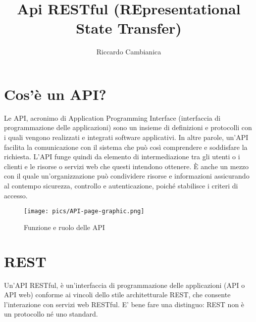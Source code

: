 \documentclass{article}
\title{Api RESTful (REpresentational State Transfer)}
\author{Riccardo Cambianica}
\begin{document}
    \maketitle
     \newpage
     \tableofcontents
     \newpage
     \section{Cos'è un API?}
         Le API, acronimo di Application Programming Interface (interfaccia di programmazione delle applicazioni) sono un insieme di definizioni e protocolli con i quali vengono realizzati e integrati software applicativi. In altre parole, un'API facilita la comunicazione con il sistema che può così comprendere e soddisfare la richiesta. L'API funge quindi da elemento di intermediazione tra gli utenti o i clienti e le risorse o servizi web che questi intendono ottenere. È anche un mezzo con il quale un'organizzazione può condividere risorse e informazioni assicurando al contempo sicurezza, controllo e autenticazione, poiché stabilisce i criteri di accesso.
         \begin{figure}[htbp]
             \centering
             \texttt{[image: pics/API-page-graphic.png]}  
             \caption{Funzione e ruolo delle API}
             \label{fig:api}
         \end{figure}
     \section{REST}
        Un'API RESTful, è un'interfaccia di programmazione delle applicazioni (API o API web) conforme ai vincoli dello stile architetturale REST, che consente l'interazione con servizi web RESTful. E' bene fare una distinguo: REST non è un protocollo né uno standard.
        
\end{document}
